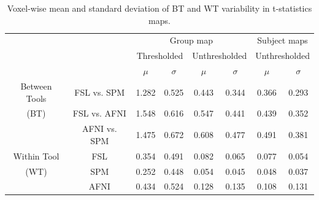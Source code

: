 \documentclass[11pt,onecolumn]{article}
\begin{document}
{\setlength{\tabcolsep}{5pt}
\begin{table}[h]
  \centering
  \begin{tabular}{cccccc|cc}
    \toprule
                      &              & \multicolumn{4}{c|}{Group map}  & \multicolumn{2}{c}{Subject maps}                                                                     \\
    \multirow{2}{*}{} & {}           & \multicolumn{2}{c}{Thresholded} & \multicolumn{2}{c|}{Unthresholded} & \multicolumn{2}{c}{Unthresholded}                               \\
    {}                & {}           & $\mu$                           & $\sigma$                           & $\mu$                             & $\sigma$ & $\mu$ & $\sigma$ \\
    \midrule
    \rowcolor{lightgray!50}
    {Between Tools}   & FSL vs. SPM  & 1.282                           & 0.525                              & 0.443                             & 0.344    & 0.366 & 0.293    \\
    \rowcolor{lightgray!50}
    {(BT)}            & FSL vs. AFNI & 1.548                           & 0.616                              & 0.547                             & 0.441    & 0.439 & 0.352    \\
    \rowcolor{lightgray!50}
    {}                & AFNI vs. SPM & 1.475                           & 0.672                              & 0.608                             & 0.477    & 0.491 & 0.381    \\
    {Within Tool}     & FSL          & 0.354                           & 0.491                              & 0.082                             & 0.065    & 0.077 & 0.054    \\
    {(WT)}            & SPM          & 0.252                           & 0.448                              & 0.054                             & 0.045    & 0.048 & 0.037    \\
    {}                & AFNI         & 0.434                           & 0.524                              & 0.128                             & 0.135    & 0.108 & 0.131    \\
    \bottomrule
  \end{tabular}
  \caption{Voxel-wise mean and standard deviation of BT and WT variability
    in t-statistics maps.}
  \label{table:pipeline-stats}
\end{table}

}
\end{document}

